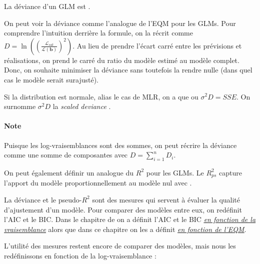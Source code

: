 \documentclass[french]{article}
\begin{document}
\begin{multicols*}{2}
\begin{definitionNOHFILL}[Déviance]
La déviance d'un GLM est .

\bigskip

On peut voir la déviance comme l'analogue de l'EQM pour les GLMs. Pour comprendre l'intuition derrière la formule, on la récrit comme $D = \ln\left(\left(\frac{\mathcal{L}_{sat}}{\mathcal{L}(\bm{b})}\right)^{2}\right)$. Au lieu de prendre l'écart carré entre les prévisions et réalisations, on prend le carré du ratio du modèle estimé au modèle complet. Donc, on souhaite minimiser la déviance sans toutefois la rendre nulle (dans quel cas le modèle serait surajusté).

\bigskip

Si la distribution est normale, alias le cas de MLR, on a que  ou $\sigma^{2}D = SSE$. On surnomme $\sigma^{2}D$ la \og \textit{scaled deviance} \fg{}.

\paragraph{Note}	Puisque les log-vraisemblances sont des sommes, on peut récrire la déviance comme une somme de composantes avec $D = \sum_{i = 1}^{n} D_{i}$.
\end{definitionNOHFILL}

\begin{definitionNOHFILL}
On peut également définir un analogue du $R^{2}$ pour les GLMs. Le $R^{2}_{ps}$ capture l'apport du modèle proportionnellement au modèle nul avec .
\end{definitionNOHFILL}

\begin{rappel_enhanced}[Contexte]
La déviance et le pseudo-$R^{2}$ sont des mesures qui servent à évaluer la qualité d'ajustement d'un modèle. Pour comparer des modèles entre eux, on redéfinit l'AIC et le BIC. Dans le chapitre de \textit{\underline{}} on a définit l'AIC et le BIC \textit{\underline{\hyperref[subsec:ICModels]{en fonction de la vraisemblance}}} alors que dans ce chapitre on les a définit \textit{\underline{\hyperref[subsec:modSelCrit]{en fonction de l'EQM}}}. 
\end{rappel_enhanced}

L'utilité des mesures restent encore de comparer des modèles, mais nous les redéfinissons en fonction de la log-vraisemblance : 


\end{multicols*}
\end{document}
